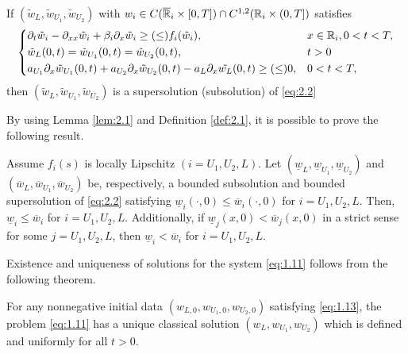 \begin{definition}
    If \((\tilde{w}_L, \tilde{w}_{U_1}, \tilde{w}_{U_2})\) with \(w_i \in C(\overline{\mathbb{R}}_i \times [0, T]) \cap C^{1,2}(\mathbb{R}_i \times (0, T])\) satisfies 
    \begin{equation}
        \begin{dcases}
            \partial_t \tilde{w}_i - \partial_{xx} \tilde{w}_i + \beta_i \partial_x \tilde{w}_i \geq (\leq) f_i(\tilde{w}_i), & x \in \mathbb{R}_i, 0 < t < T, \\
            \tilde{w}_L(0, t) = \tilde{w}_{U_1}(0, t) = \tilde{w}_{U_2}(0, t), & t > 0 \\
            a_{U_1} \partial_x \tilde{w}_{U_1}(0, t) + a_{U_2} \partial_x \tilde{w}_{U_2}(0, t) - a_L \partial_x \tilde{w_L}(0, t) \geq (\leq) 0, & 0 < t < T, \\
        \end{dcases}
        \label{eq:2.2}
    \end{equation}
    then \((\tilde{w}_L, \tilde{w}_{U_1}, \tilde{w}_{U_2})\) is a supersolution (subsolution) of \ref{eq:2.2}
    \label{def:2.1}
\end{definition}

By using Lemma \ref{lem:2.1} and Definition \ref{def:2.1}, it is possible to prove the following result.

\begin{lemma}
    Assume \(f_i(s)\) is locally Lipschitz \((i = U_1, U_2, L)\). Let \((\underline{w}_L, \underline{w}_{U_1}, \underline{w}_{U_2})\) and \((\overline{w}_L, \overline{w}_{U_1}, \overline{w}_{U_2})\) be, respectively, a bounded subsolution and bounded supersolution of \ref{eq:2.2} satisfying \(\underline{w}_i(\cdot, 0) \leq \overline{w}_i(\cdot, 0)\) for \(i = U_1, U_2, L\). Then, \(\underline{w}_i \leq \overline{w}_i\) for \(i = U_1, U_2, L\). Additionally, if \(\underline{w}_j(x,0) < \overline{w}_j(x,0)\) in a strict sense for some \(j = U_1, U_2, L\), then \(\underline{w}_i < \overline{w}_i\) for \(i = U_1, U_2, L\).
    \label{lem:2.2} 
\end{lemma}
Existence and uniqueness of solutions for the system \ref{eq:1.11} follows from the following theorem.
\begin{theorem}
    For any nonnegative initial data \((w_{L,0}, w_{U_1,0}, w_{U_2,0})\) satisfying \eqref{eq:1.13}, the problem \eqref{eq:1.11} has a unique classical solution \((w_L, w_{U_1}, w_{U_2})\) which is defined and uniformly for all \(t > 0\).
    \label{thm:2.4}
\end{theorem}


